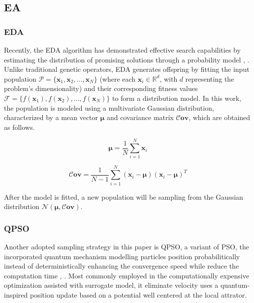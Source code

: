 \documentclass[review]{elsarticle}
\begin{document}
\subsection{EA}
\subsubsection{EDA}

Recently, the EDA algorithm has demonstrated effective search capabilities by estimating the distribution of promising solutions through a probability model \cite{chen2020language}, \cite{liu2023surrogate}. Unlike traditional genetic operators, EDA generates offspring by fitting the input population $\mathcal{P}=\{\boldsymbol{x}_1,\boldsymbol{x}_2,...,\boldsymbol{x}_N\}$ (where each $\boldsymbol{x}_i \in \mathbb{R}^d$, with $d$ representing the problem's dimensionality) and their corresponding fitness values $\mathcal{F}=\{f(\boldsymbol{x}_1),f(\boldsymbol{x}_2),...,f(\boldsymbol{x}_N)\}$ to form a distribution model. In this work, the population is modeled using a multivariate Gaussian distribution, characterized by a mean vector $\boldsymbol{\mu}$ and covariance matrix $\boldsymbol{\mathcal{C}ov}$, which are obtained as follows.

\begin{equation}
    \boldsymbol{\mu} = \frac{1}{N}\sum\limits_{i=1}^{N}\boldsymbol{x}_i
\end{equation}

\begin{equation}
    \boldsymbol{\mathcal{C}ov} = \frac{1}{N-1}\sum\limits_{i=1}^N(\boldsymbol{x}_i-\boldsymbol{\mu})(\boldsymbol{x}_i-\boldsymbol{\mu})^T
\end{equation}

After the model is fitted, a new population will be sampling from the Gaussian distribution $\mathcal{N}(\boldsymbol{\mu},\boldsymbol{\mathcal{C}ov})$.

\subsubsection{QPSO}
Another adopted sampling strategy in this paper is QPSO, a variant of PSO, the incorporated quantum mechanism modelling particles position probabilitically instead of deterministically enhancing the convergence speed while reduce the computation time \cite{sun2012quantum}, \cite{li2025multi}. Most commonly employed in the computationally expensive optimization assisted with surrogate model, it eliminate velocity uses a quantum-inspired position update based on a potential well centered at the local attrator.
\end{document}
